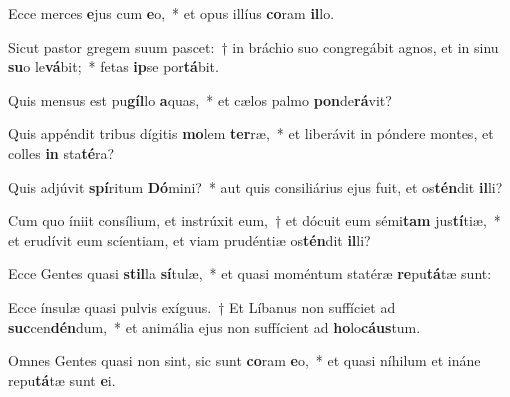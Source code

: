 \item Ecce merces \textbf{e}jus cum \textbf{e}o,~* et opus illíus \textbf{co}ram \textbf{il}lo.
\item Sicut pastor gregem suum pascet:~† in bráchio suo congregábit agnos, et in sinu \textbf{su}o le\textbf{vá}bit;~* fetas \textbf{ip}se por\textbf{tá}bit.
\item Quis mensus est pu\textbf{gíl}lo \textbf{a}quas,~* et cælos palmo \textbf{pon}de\textbf{rá}vit?
\item Quis appéndit tribus dígitis \textbf{mo}lem \textbf{ter}ræ,~* et liberávit in póndere montes, et colles \textbf{in} sta\textbf{té}ra?
\item Quis adjúvit \textbf{spí}ritum \textbf{Dó}mini?~* aut quis consiliárius ejus fuit, et os\textbf{tén}dit \textbf{il}li?
\item Cum quo íniit consílium, et instrúxit eum,~† et dócuit eum sémi\textbf{tam} jus\textbf{tí}tiæ,~* et erudívit eum scíentiam, et viam prudéntiæ os\textbf{tén}dit \textbf{il}li?
\item Ecce Gentes quasi \textbf{stil}la \textbf{sí}tulæ,~* et quasi moméntum statéræ \textbf{re}pu\textbf{tá}tæ sunt:
\item Ecce ínsulæ quasi pulvis exíguus.~† Et Líbanus non suffíciet ad \textbf{suc}cen\textbf{dén}dum,~* et animália ejus non suffícient ad \textbf{ho}lo\textbf{cáus}tum.
\item Omnes Gentes quasi non sint, sic sunt \textbf{co}ram \textbf{e}o,~* et quasi níhilum et ináne repu\textbf{tá}tæ sunt \textbf{e}i.

